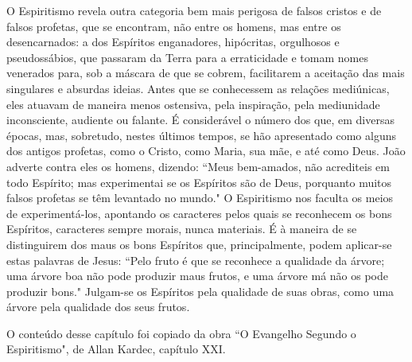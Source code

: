 \emdash{}O Espiritismo revela outra categoria bem mais perigosa de falsos
cristos e de falsos profetas, que se encontram, não entre os homens,
mas entre os desencarnados: a dos Espíritos enganadores, hipócritas,
orgulhosos e pseudossábios, que passaram da Terra para a erraticidade
e tomam nomes venerados para, sob a máscara de que se cobrem, facilitarem a aceitação das mais singulares e absurdas ideias. Antes que se
conhecessem as relações mediúnicas, eles atuavam de maneira menos
ostensiva, pela inspiração, pela mediunidade inconsciente, audiente ou
falante. É considerável o número dos que, em diversas épocas, mas,
sobretudo, nestes últimos tempos, se hão apresentado como alguns dos
antigos profetas, como o Cristo, como Maria, sua mãe, e até como Deus.
João adverte contra eles os homens, dizendo: ``Meus bem-amados, não
acrediteis em todo Espírito; mas experimentai se os Espíritos são de
Deus, porquanto muitos falsos profetas se têm levantado no mundo."
O Espiritismo nos faculta os meios de experimentá-los, apontando os
caracteres pelos quais se reconhecem os bons Espíritos, caracteres sempre
morais, nunca materiais. É à maneira de se distinguirem dos maus os
bons Espíritos que, principalmente, podem aplicar-se estas palavras de
Jesus: ``Pelo fruto é que se reconhece a qualidade da árvore; uma árvore boa não pode produzir maus frutos, e uma árvore má não os pode produzir bons." Julgam-se os Espíritos pela qualidade de suas obras, como
uma árvore pela qualidade dos seus frutos.

O conteúdo desse capítulo foi copiado da obra ``O Evangelho Segundo o Espiritismo", de Allan Kardec, capítulo XXI.